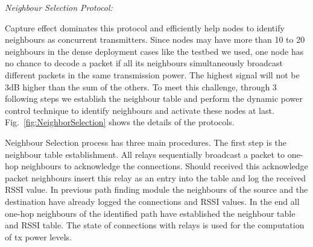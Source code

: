 \documentclass[conference]{IEEEtran}
\begin{document}
\emph{Neighbour Selection Protocol:}

Capture effect dominates this protocol and efficiently help nodes to identify neighbours as concurrent transmitters. Since nodes may have more than 10 to 20 neighbours in the dense deployment cases like the testbed \cite{doddavenkatappa2012indriya} we used, one node has no chance to decode a packet if all its neighbours simultaneously broadcast different packets in the same transmission power. The highest signal will not be 3dB higher than the sum of the others. To meet this challenge, through 3 following steps we establish the neighbour table and perform the dynamic power control technique to identify neighbours and activate these nodes at last. Fig.~\ref{fig:NeighborSelection} shows the details of the protocols.

Neighbour Selection process has three main procedures. The first step is the neighbour table establishment. All relays sequentially broadcast a packet to one-hop neighbours to acknowledge the connections. Should received this acknowledge packet neighbours insert this relay as an entry into the table and log the received RSSI value. In previous path finding module the neighbours of the source and the destination have already logged the connections and RSSI values. In the end all one-hop neighbours of the identified path have established the neighbour table and RSSI table. The state of connections with relays is used for the computation of tx power levels.
\end{document}
